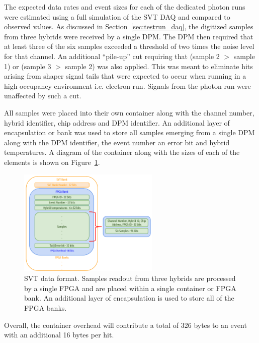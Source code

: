 
%
%

The expected data rates and event sizes for each of the dedicated photon runs
were estimated using a full simulation of the SVT DAQ and compared to observed
values. As discussed in Section~\ref{sec:testrun_daq}, the digitized samples
from three hybrids were received by a single DPM.  The DPM then required that
at least three of the six samples exceeded a threshold of two times the noise
level for that channel.  An additional ``pile-up'' cut requiring that 
(sample 2 $>$ sample 1) or (sample 3 $>$ sample 2) was also applied. This was
meant to eliminate hits arising from shaper signal tails that were expected
to occur when running in a high occupancy environment i.e. electron run.
Signals from the photon run were unaffected by such a cut. 

All samples were placed into their own container along with the 
channel number, hybrid identifier, chip address and DPM identifier. An 
additional layer of encapsulation or bank was used to store all samples 
emerging from a single DPM along with the DPM identifier, the event number
an error bit and hybrid temperatures. A diagram of the container along with
the sizes of each of the elements is shown on Figure~\ref{fig:data_format}.
\begin{figure}[h]
    \begin{center}
    	\includegraphics[width=0.60\textwidth]{test2012/svtperformance/daq/svt_data_format.pdf}
        \caption{
                    SVT data format. Samples readout from three hybrids are 
                    processed by a single FPGA and are placed within a single
                    container or FPGA bank.  An additional layer of 
                    encapsulation is used to store all of the FPGA banks.
                 } 
	\label{fig:data_format}
    \end{center}
\end{figure}
Overall, the container overhead will contribute a total of 326 bytes to an event
with an additional 16 bytes per hit.


